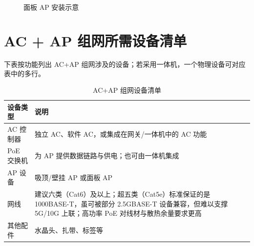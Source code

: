 \documentclass[UTF8]{ctexbook}
\begin{document}
\begin{figure}[htbp]
\centering
\caption{面板 AP 安装示意}
\label{fig:panel-ap}
\end{figure}

\section{AC + AP 组网所需设备清单}

下表按功能列出 AC+AP 组网涉及的设备；若采用一体机，一个物理设备可对应表中的多行。

\begin{table}[htbp]
\centering
\caption{AC+AP 组网设备清单}
\label{tab:ac-ap-devices}
\begin{tabular}{l>{\raggedright\arraybackslash}p{}}
\toprule
\textbf{设备类型} & \textbf{说明} \\
\midrule
AC 控制器 & 独立 AC、软件 AC，或集成在网关/一体机中的 AC 功能 \\
PoE 交换机 & 为 AP 提供数据链路与供电；也可由一体机集成 \\
AP 设备 & 吸顶/壁挂 AP 或面板 AP \\
网线 & 建议六类（Cat6）及以上；超五类（Cat5e）标准保证的是 1000BASE-T，虽可被部分 2.5GBASE-T 设备兼容，但难以支撑 5G/10G 上联；高功率 PoE 对线材与散热余量要求更高 \\
其他配件 & 水晶头、扎带、标签等 \\
\bottomrule
\end{tabular}
\end{table}
\end{document}

